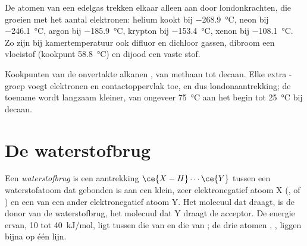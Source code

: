 \begin{example}\label{ex:b1:intermolecular-forces-solvents:noble}
De atomen van een edelgas trekken elkaar alleen aan door londonkrachten,
die groeien met het aantal elektronen: helium kookt bij
\qty{-268.9}{\celsius}, neon bij \qty{-246.1}{\celsius}, argon bij
\qty{-185.9}{\celsius}, krypton bij \qty{-153.4}{\celsius}, xenon bij
\qty{-108.1}{\celsius}. Zo zijn bij kamertemperatuur ook difluor en
dichloor gassen, dibroom een vloeistof (kookpunt \qty{58.8}{\celsius})
en dijood een vaste stof.
\end{example}

\begin{omfigure}

{\small Kookpunten van de onvertakte alkanen , van
methaan tot decaan. Elke extra -groep voegt elektronen en
contactoppervlak toe, en dus londonaantrekking; de toename wordt langzaam
kleiner, van ongeveer \qty{75}{\celsius} aan het begin tot
\qty{25}{\celsius} bij decaan.}
\end{omfigure}

\section{De waterstofbrug}

\begin{definition}[Waterstofbrug]\label{def:b1:intermolecular-forces-solvents:hbond}
Een \emph{waterstofbrug} is een aantrekking
$\ce{X-H}\cdots\ce{Y}$ tussen een waterstofatoom dat gebonden is aan een
klein, zeer elektronegatief atoom X (,  of ) en een  van een ander elektronegatief atoom Y. Het molecuul dat
 draagt, is de donor van de waterstofbrug, het molecuul dat Y
draagt de acceptor. De energie ervan, 10 tot \qty{40}{kJ/mol}, ligt
tussen die van  en die van ; de
drie atomen , ,  liggen bijna op één lijn.
\end{definition}

